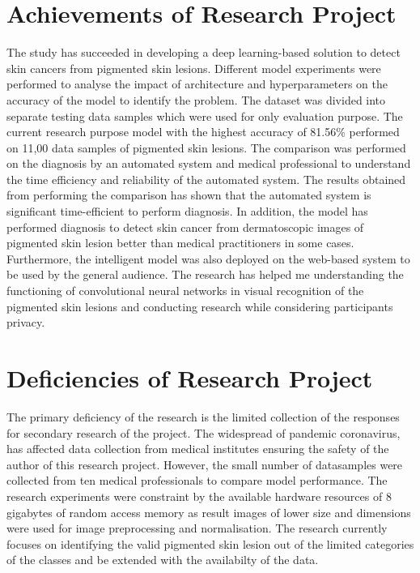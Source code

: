 \section{Achievements of Research Project}
The study has succeeded in developing a deep learning-based solution to detect skin cancers from pigmented skin lesions.
Different model experiments were performed to analyse the impact of architecture and hyperparameters on the accuracy of the model to identify the problem. 
The dataset was divided into separate testing data samples which were used for only evaluation purpose. The current research purpose model with the highest accuracy of 81.56\% performed on 11,00 data samples of pigmented skin lesions. 
The comparison was performed on the diagnosis by an automated system and medical professional to understand the time efficiency and reliability of the automated system. 
The results obtained from performing the comparison has shown that the automated system is significant time-efficient to perform diagnosis. 
In addition, the model has performed diagnosis to detect skin cancer from dermatoscopic images of pigmented skin lesion better than medical practitioners in some cases.
Furthermore, the intelligent model was also deployed on the web-based system to be used by the general audience. 
The research has helped me understanding the functioning of convolutional neural networks in visual recognition of the pigmented skin lesions
and conducting research while considering participants privacy.

\section{Deficiencies of Research Project}
The primary deficiency of the research is the limited collection of the responses for secondary research of the project. 
The widespread of pandemic coronavirus, has affected data collection from medical institutes ensuring the safety of the author of this research project. 
However, the small number of datasamples were collected from ten medical professionals to compare model performance.
The research experiments were constraint by the available hardware resources of 8 gigabytes of random access memory as result images of lower size and dimensions were used for image preprocessing and normalisation.
The research currently focuses on identifying the valid pigmented skin lesion out of the limited categories of the 
classes and be extended with the availabilty of the data.

